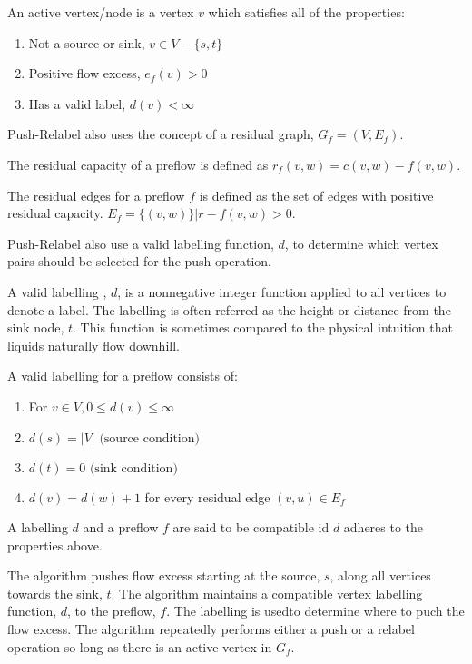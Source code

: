 \begin{definition}
	An active vertex/node is a vertex $v$ which satisfies all of the properties:
	\begin{enumerate}
		\item Not a source or sink, $v \in V-\{s,t\}$
		\item Positive flow excess, $e_f(v) > 0$
		\item Has a valid label, $d(v) < \infty$
	\end{enumerate}
\end{definition}

Push-Relabel also uses the concept of a residual graph, $G_f=(V, E_f)$.

\begin{definition}
	The residual capacity of a preflow is defined as $r_f(v,w) = c(v,w)-f(v,w)$.
\end{definition}

\begin{definition}
	The residual edges for a preflow $f$ is defined as the set of edges with positive residual capacity. $E_f = \{(v,w)\} | r-f(v,w) > 0$.
\end{definition}

\begin{definition}[Labelling]
	Push-Relabel also use a valid labelling function, $d$, to determine which vertex pairs should be selected for the push operation.
\end{definition}
A valid labelling , $d$, is a nonnegative integer function applied to all vertices to denote a label. The labelling is often referred as the height or distance from the sink node, $t$. This function is sometimes compared to the physical intuition that liquids naturally flow downhill.

A valid labelling for a preflow consists of:
\begin{enumerate}
	\item For $v \in V, 0 \leq d(v) \leq \infty$
	\item $d(s) = |V| \text{ (source condition)}$
	\item $d(t) = 0 \text{ (sink condition)}$
	\item $d(v) = d(w) + 1$ for every residual edge $(v,u) \in E_f$
\end{enumerate}
A labelling $d$ and a preflow $f$ are said to be compatible id $d$ adheres to the properties above.

The algorithm pushes flow excess starting at the source, $s$, along all vertices towards the sink, $t$. The algorithm maintains a compatible vertex labelling function, $d$, to the preflow, $f$. The labelling is usedto determine where to puch the flow excess. The algorithm repeatedly performs either a push or a relabel operation so long as there is an active vertex in $G_f$.

